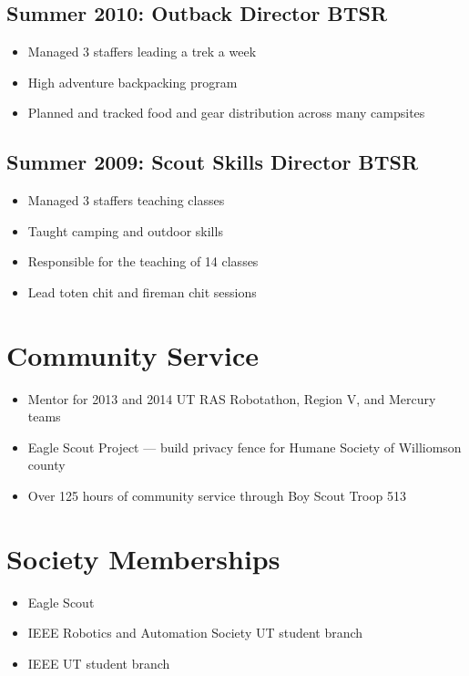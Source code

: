 \documentclass[letterpaper,12pt]{resume}
\begin{document}
\subsection{Summer 2010: Outback Director BTSR}
\begin{itemize}
  \item
    Managed 3 staffers leading a trek a week
  \item
    High adventure backpacking program
  \item
    Planned and tracked food and gear distribution across many campsites
\end{itemize}

\subsection{Summer 2009: Scout Skills Director BTSR}
\begin{itemize}
  \item
    Managed 3 staffers teaching classes
  \item
    Taught camping and outdoor skills
  \item
    Responsible for the teaching of 14 classes
  \item
    Lead toten chit and fireman chit sessions
\end{itemize}

\section{Community Service}
\begin{itemize}
  \item
    Mentor for 2013 and 2014 UT RAS Robotathon, Region V, and Mercury teams
  \item
    Eagle Scout Project --- build privacy fence for Humane Society of Williomson county
  \item
    Over 125 hours of community service through Boy Scout Troop 513
\end{itemize}

\section{Society Memberships}
\begin{itemize}
  \item
    Eagle Scout
  \item
    IEEE Robotics and Automation Society UT student branch
  \item
    IEEE UT student branch
\end{itemize}
\end{document}
